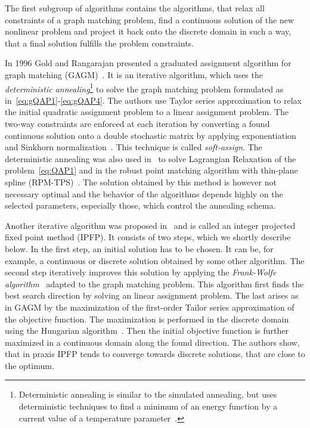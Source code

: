 The first subgroup of algorithms contains the algorithms, that relax all constraints of a graph matching problem, find a continuous solution of the new nonlinear problem and project it back onto the discrete domain in such a way, that a final solution fulfills the problem constraints. 

In 1996 Gold and Rangarajan presented a graduated assignment algorithm for graph matching (GAGM)~\cite{Rangarajan1996_GAGM}. It is an iterative algorithm, which uses the \emph{deterministic annealing}\footnote{Deterministic annealing is similar to the simulated annealing, but uses deterministic techniques to find a minimum of an energy function by a current value of a temperature parameter~\cite{Rose1991_DA}.} to solve the graph matching problem formulated as in~\eqref{eq:gQAP1}-\eqref{eq:gQAP4}. The authors use Taylor series approximation to relax the initial quadratic assignment problem to a linear assignment problem. The two-way constraints are enforced at each iteration by converting a  found continuous solution onto a double stochastic matrix by applying exponentiation and Sinkhorn normalization~\cite{Sinkhorn1964}. This technique is called \emph{soft-assign}. The deterministic annealing was also used in~\cite{Rangarajan96_LagRelax} to solve Lagrangian Relaxation of the problem~\eqref{eq:QAP1} and in the robust point matching algorithm with thin-plane spline (RPM-TPS)~\cite{Chui2003}. The solution obtained by this method is however not necessary optimal and the behavior of the algorithms depends highly on the selected parameters, especially those, which control the annealing schema.

Another iterative algorithm was proposed in~\cite{Leordeanu2009_IPFP} and is called an integer projected fixed point method (IPFP). It consists of two steps, which we shortly describe below. In the first step, an initial solution has to be chosen. It can be, for example, a continuous or discrete solution obtained by some other algorithm. The second step iteratively improves this solution by applying the \emph{Frank-Wolfe algorithm}~\cite{Wolfe1956} adapted to the graph matching problem. This algorithm first finds the best search direction by solving an linear assignment problem. The last arises as in GAGM by the maximization of the first-order Tailor series approximation of the objective function. The maximization is performed in the discrete domain using the Hungarian algorithm~\cite{Kuhn1955}. Then the initial objective function is further maximized in a continuous domain along the found direction. The authors show, that in praxis IPFP tends to converge towards discrete solutions, that are close to the optimum.

